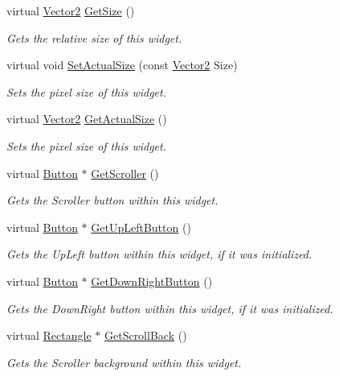 \begin{DoxyCompactItemize}
virtual \hyperlink{classphys_1_1Vector2}{Vector2} \hyperlink{classphys_1_1UI_1_1Scrollbar_aff97ce371ee21fcf3b648dcf8b38e055}{GetSize} ()
\begin{DoxyCompactList}\small\item\em Gets the relative size of this widget. \item\end{DoxyCompactList}\item 
virtual void \hyperlink{classphys_1_1UI_1_1Scrollbar_ae21108cb65871ba59da2984542eab1a1}{SetActualSize} (const \hyperlink{classphys_1_1Vector2}{Vector2} Size)
\begin{DoxyCompactList}\small\item\em Sets the pixel size of this widget. \item\end{DoxyCompactList}\item 
virtual \hyperlink{classphys_1_1Vector2}{Vector2} \hyperlink{classphys_1_1UI_1_1Scrollbar_a2b3d791cbbe4c787f284d8b12a0edf27}{GetActualSize} ()
\begin{DoxyCompactList}\small\item\em Sets the pixel size of this widget. \item\end{DoxyCompactList}\item 
virtual \hyperlink{classphys_1_1UI_1_1Button}{Button} $\ast$ \hyperlink{classphys_1_1UI_1_1Scrollbar_a28024d2f3a017e4ed3c2a4df62a1e8be}{GetScroller} ()
\begin{DoxyCompactList}\small\item\em Gets the Scroller button within this widget. \item\end{DoxyCompactList}\item 
virtual \hyperlink{classphys_1_1UI_1_1Button}{Button} $\ast$ \hyperlink{classphys_1_1UI_1_1Scrollbar_ab298f9747da2eed451ddce8b1a416c15}{GetUpLeftButton} ()
\begin{DoxyCompactList}\small\item\em Gets the UpLeft button within this widget, if it was initialized. \item\end{DoxyCompactList}\item 
virtual \hyperlink{classphys_1_1UI_1_1Button}{Button} $\ast$ \hyperlink{classphys_1_1UI_1_1Scrollbar_abf733d00087050d575fca1abc2d4ba0e}{GetDownRightButton} ()
\begin{DoxyCompactList}\small\item\em Gets the DownRight button within this widget, if it was initialized. \item\end{DoxyCompactList}\item 
virtual \hyperlink{classphys_1_1UI_1_1Rectangle}{Rectangle} $\ast$ \hyperlink{classphys_1_1UI_1_1Scrollbar_a1c24fbb88f9d86aff1b2f0abc033116a}{GetScrollBack} ()
\begin{DoxyCompactList}\small\item\em Gets the Scroller background within this widget. \item\end{DoxyCompactList}\end{DoxyCompactItemize}
